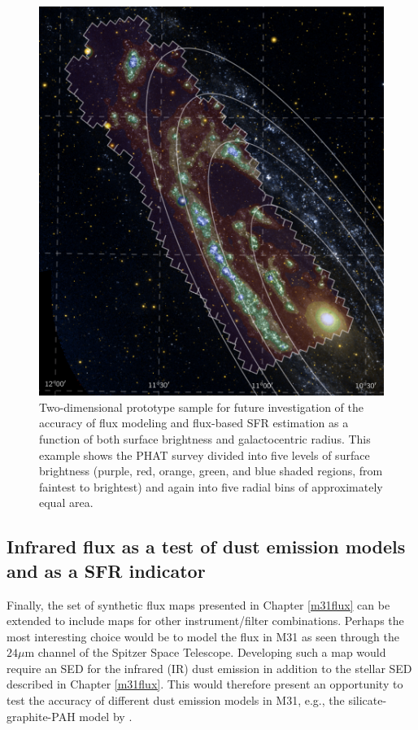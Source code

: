 \begin{figure}
\centering
\includegraphics[scale=0.85]{prototype.pdf}
\caption[Two-dimensional prototype sample.]{Two-dimensional prototype sample
    for future investigation of the accuracy of flux modeling and flux-based
    SFR estimation as a function of both surface brightness and galactocentric
    radius. This example shows the PHAT survey divided into five levels of
    \fuv{} surface brightness (purple, red, orange, green, and blue shaded
    regions, from faintest to brightest) and again into five radial bins of
    approximately equal area.
}
\label{fig:mfx:dummy1}
\end{figure}


\subsection{Infrared flux as a test of dust emission models and as a SFR indicator}

Finally, the set of synthetic flux maps presented in Chapter \ref{m31flux} can
be extended to include maps for other instrument/filter combinations. Perhaps
the most interesting choice would be to model the flux in M31 as seen through
the $24\mu\mathrm{m}$ channel of the Spitzer Space Telescope. Developing such a
map would require an SED for the infrared (IR) dust emission in addition to the
stellar SED described in Chapter \ref{m31flux}. This would therefore present an
opportunity to test the accuracy of different dust emission models in M31,
e.g., the silicate-graphite-PAH model by \citet{Draine:2007}.

